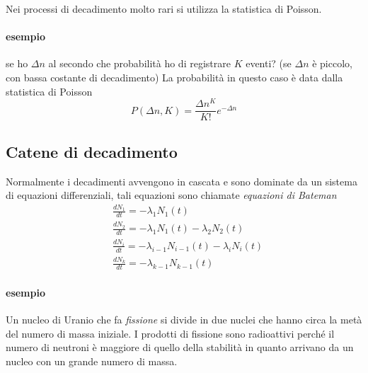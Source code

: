Nei processi di decadimento molto rari si utilizza la statistica di Poisson.
\paragraph{esempio} se ho $\Delta n$ al secondo che probabilità ho di registrare $K$ eventi? (se $\Delta n$ è piccolo, con bassa costante di decadimento)
La probabilità in questo caso è data dalla statistica di Poisson
\begin{equation}
P(\Delta n, K) = \frac{\Delta n^K}{K!} e^{ -\Delta n }
\end{equation}

\subsection{Catene di decadimento}
Normalmente i decadimenti avvengono in cascata e sono dominate da un sistema di equazioni differenziali, tali equazioni sono chiamate \emph{equazioni di Bateman}
\begin{equation}
\begin{split}
& \frac{dN_1}{dt} = - \lambda_1 N_1(t) \\
& \frac{dN_2}{dt} = - \lambda_1 N_1(t) - \lambda_2 N_2(t) \\
& \frac{dN_i}{dt} = - \lambda_{i-1} N_{i-1}(t) - \lambda_i N_i(t) \\
& \frac{dN_k}{dt} = - \lambda_{k-1} N_{k-1}(t)
\end{split}
\label{bateman_equations}
\end{equation}

\paragraph{esempio} Un nucleo di Uranio che fa \emph{fissione} si divide in due nuclei che hanno circa la metà del numero di massa iniziale. I prodotti di fissione sono radioattivi perché il numero di neutroni è maggiore di quello della stabilità in quanto arrivano da un nucleo con un grande numero di massa.











